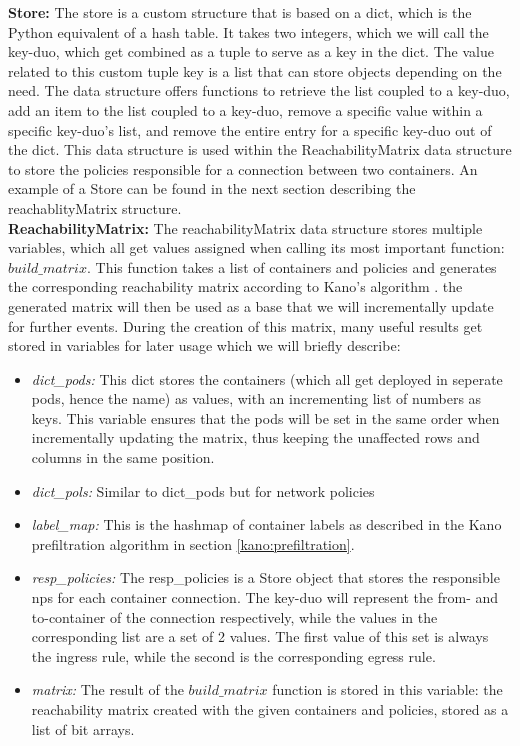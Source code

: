 \textbf{Store:} The store is a custom structure that is based on a dict, which is the Python equivalent of a hash table. It takes two integers, which we will call the key-duo, which get combined as a tuple to serve as a key in the dict. The value related to this custom tuple key is a list that can store objects depending on the need. The data structure offers functions to retrieve the list coupled to a key-duo, add an item to the list coupled to a key-duo, remove a specific value within a specific key-duo's list, and remove the entire entry for a specific key-duo out of the dict. This data structure is used within the ReachabilityMatrix data structure to store the policies responsible for a connection between two containers. An example of a Store can be found in the next section describing the reachablityMatrix structure.
\\[10pt]

\textbf{ReachabilityMatrix:} The reachabilityMatrix data structure stores multiple variables, which all get values assigned when calling its most important function: $build\_matrix$. This function takes a list of containers and policies and generates the corresponding reachability matrix according to Kano's algorithm \cite{kano}. the generated matrix will then be used as a base that we will incrementally update for further events. During the creation of this matrix, many useful results get stored in variables for later usage which we will briefly describe:

\begin{itemize}
    \renewcommand{\labelitemi}{\scriptsize$\blacksquare$}
    \item \textit{dict\_pods:} This dict stores the containers (which all get deployed in seperate pods, hence the name) as values, with an incrementing list of numbers as keys. This variable ensures that the pods will be set in the same order when incrementally updating the matrix, thus keeping the unaffected rows and columns in the same position.
     \item \textit{dict\_pols:} Similar to dict\_pods but for network policies
     \item \textit{label\_map:} This is the hashmap of container labels as described in the Kano prefiltration algorithm in section \ref{kano:prefiltration}. 
     \item \textit{resp\_policies:} The resp\_policies is a Store object that stores the responsible \acrshort{np}s for each container connection. The key-duo will represent the from- and to-container of the connection respectively, while the values in the corresponding list are a set of 2 values. The first value of this set is always the ingress rule, while the second is the corresponding egress rule.
     \item \textit{matrix:} The result of the $build\_matrix$ function is stored in this variable: the reachability matrix created with the given containers and policies, stored as a list of bit arrays.
\end{itemize}

